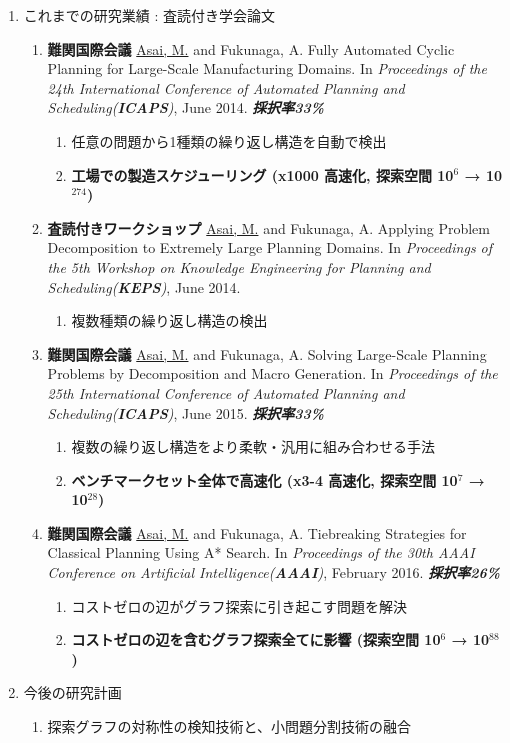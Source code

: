 \begin{smaller}
\begin{enumerate}
\item これまでの研究業績 : 査読付き学会論文
\begin{enumerate}
\item \textbf{難関国際会議} \uline{Asai, M.} and Fukunaga, A. Fully Automated Cyclic Planning for Large-Scale Manufacturing Domains. In \emph{Proceedings of the 24th International Conference of Automated Planning and Scheduling(\textbf{ICAPS})}, June 2014. \textbf{\emph{採択率33\%}}
\begin{enumerate}
\item 任意の問題から1種類の繰り返し構造を自動で検出
\item \textbf{工場での製造スケジューリング (x1000 高速化, 探索空間 10$^{\text{6}}$ → 10$^{\text{274}}$)}
\end{enumerate}
\item \textbf{査読付きワークショップ} \uline{Asai, M.} and Fukunaga, A. Applying Problem Decomposition to Extremely Large Planning Domains. In \emph{Proceedings of the 5th Workshop on Knowledge Engineering for Planning and Scheduling(\textbf{KEPS})}, June 2014.
\begin{enumerate}
\item 複数種類の繰り返し構造の検出
\end{enumerate}
\item \textbf{難関国際会議} \uline{Asai, M.} and Fukunaga, A. Solving Large-Scale Planning Problems by Decomposition and Macro Generation. In \emph{Proceedings of the 25th International Conference of Automated Planning and Scheduling(\textbf{ICAPS})}, June 2015.  \textbf{\emph{採択率33\%}}
\begin{enumerate}
\item 複数の繰り返し構造をより柔軟・汎用に組み合わせる手法
\item \textbf{ベンチマークセット全体で高速化 (x3-4 高速化, 探索空間 10$^{\text{7}}$ → 10$^{\text{28}}$)}
\end{enumerate}
\item \textbf{難関国際会議} \uline{Asai, M.} and Fukunaga, A. Tiebreaking Strategies for Classical Planning Using A* Search. In \emph{Proceedings of the 30th AAAI Conference on Artificial Intelligence(\textbf{AAAI})}, February 2016. \textbf{\emph{採択率26\%}}
\begin{enumerate}
\item コストゼロの辺がグラフ探索に引き起こす問題を解決
\item \textbf{コストゼロの辺を含むグラフ探索全てに影響 (探索空間 10$^{\text{6}}$ → 10$^{\text{88}}$)}
\end{enumerate}
\end{enumerate}
\item 今後の研究計画
\begin{enumerate}
\item 探索グラフの対称性の検知技術と、小問題分割技術の融合
\end{enumerate}
\end{enumerate}
\end{smaller}

